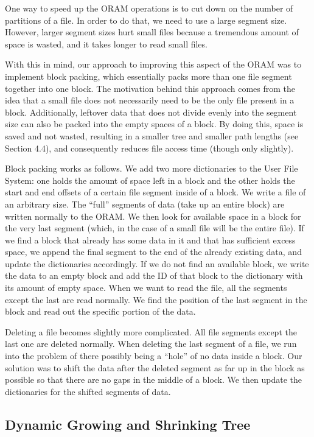 \documentclass{article}
\begin{document}
\begin{multicols}{2}
One way to speed up the ORAM operations is to cut down on the number of partitions of a file. In order to do that, we need to use a large segment size. However, larger segment sizes hurt small files because a tremendous amount of space is wasted, and it takes longer to read small files. 
\par With this in mind, our approach to improving this aspect of the ORAM was to implement block packing, which essentially packs more than one file segment together into one block. The motivation behind this approach comes from the idea that a small file does not necessarily need to be the only file present in a block. Additionally, leftover data that does not divide evenly into the segment size can also be packed into the empty spaces of a block. By doing this, space is saved and not wasted, resulting in a smaller tree and smaller path lengths (see Section 4.4), and consequently reduces file access time (though only slightly).
\par Block packing works as follows. We add two more dictionaries to the User File System: one holds the amount of space left in a block and the other holds the start and end offsets of a certain file segment inside of a block. We write a file of an arbitrary size. The “full” segments of data (take up an entire block) are written normally to the ORAM. We then look for available space in a block for the very last segment (which, in the case of a small file will be the entire file). If we find a block that already has some data in it and that has sufficient excess space, we append the final segment to the end of the already existing data, and update the dictionaries accordingly. If we do not find an available block, we write the data to an empty block and add the ID of that block to the dictionary with its amount of empty space. When we want to read the file, all the segments except the last are read normally. We find the position of the last segment in the block and read out the specific portion of the data.
\par Deleting a file becomes slightly more complicated. All file segments except the last one are deleted normally. When deleting the last segment of a file, we run into the problem of there possibly being a “hole” of no data inside a block. Our solution was to shift the data after the deleted segment as far up in the block as possible so that there are no gaps in the middle of a block. We then update the dictionaries for the shifted segments of data. 

\subsection{Dynamic Growing and Shrinking Tree}


\end{multicols}
\end{document}
